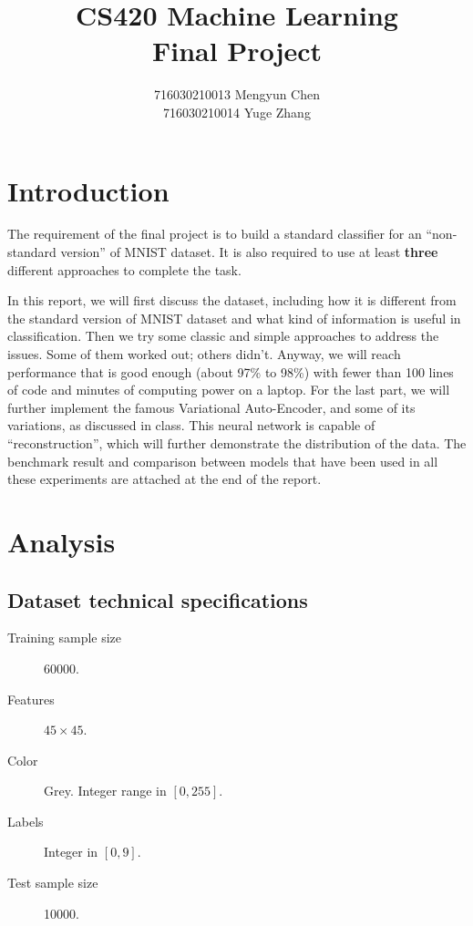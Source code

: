 \documentclass[a4paper,10pt,UTF8]{article}
\title{CS420 Machine Learning \\ Final Project}
\author{716030210013 \quad Mengyun Chen \\
716030210014 \quad Yuge Zhang}
\numberwithin{equation}{section}
\numberwithin{figure}{section}
\begin{document}
\maketitle

\renewcommand*\contentsname{Summary}

\tableofcontents


\everymath{\displaystyle}

\section{Introduction}

The requirement of the final project is to build a standard classifier for an ``non-standard version'' of MNIST dataset. It is also required to use at least \textbf{three} different approaches to complete the task.

In this report, we will first discuss the dataset, including how it is different from the standard version of MNIST dataset and what kind of information is useful in classification. Then we try some classic and simple approaches to address the issues. Some of them worked out; others didn't. Anyway, we will reach performance that is good enough (about 97\% to 98\%) with fewer than 100 lines of code and minutes of computing power on a laptop. For the last part, we will further implement the famous Variational Auto-Encoder, and some of its variations, as discussed in class. This neural network is capable of ``reconstruction'', which will further demonstrate the distribution of the data. The benchmark result and comparison between models that have been used in all these experiments are attached at the end of the report.

\section{Analysis}

\subsection{Dataset technical specifications}

\begin{description}
\item[Training sample size] 60000.
\item[Features] $45 \times 45$.
\item[Color] Grey. Integer range in $[0, 255]$.
\item[Labels] Integer in $[0,9]$.
\item[Test sample size] 10000.
\end{description}
\end{document}
